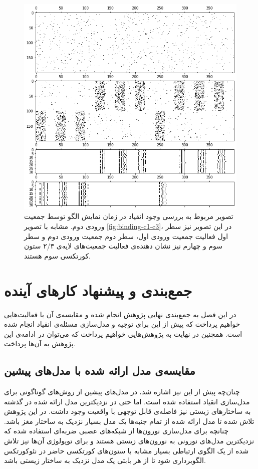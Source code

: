 \documentclass[12pt]{report}
\begin{document}
\begin{figure}[H]
	\centering
	\includegraphics[width=1.0\linewidth]{binding-c2-c3.png}
	\caption[NS]{
		تصویر مربوط به بررسی وجود انقیاد در زمان نمایش الگو توسط جمعیت ورودی دوم. مشابه با تصویر \ref{fig:binding-c1-c3}، در این تصویر نیز سطر اول فعالیت جمعیت ورودی اول، سطر دوم جمعیت ورودی دوم و سطر سوم و چهارم نیز نشان دهنده‌ی فعالیت جمعیت‌های لایه‌ی ۲/۳ ستون کورتکسی سوم هستند.
	}
	\label{fig:binding-c2-c3} 
\end{figure}

	
	
	\chapter{جمع‌بندی و پیشنهاد کار‌های آینده}
	در این فصل به جمع‌بندی نهایی پژوهش انجام شده و مقایسه‌ی آن با فعالیت‌هایی خواهیم پرداخت که پیش از این برای توجیه و مدل‌سازی مسئله‌ی انقیاد انجام شده است. همچنین در نهایت به پژوهش‌هایی خواهیم پرداخت که می‌توان در ادامه‌ی این پژوهش به آن‌ها پرداخت.
	
	\section{مقایسه‌ی مدل ارائه شده با مدل‌های پیشین}
	چنان‌چه پیش از این نیز اشاره شد، در مدل‌های پیشین از روش‌های گوناگونی برای مدل‌سازی انقیاد استفاده شده است. اما حتی در نزدیکترین مدل ارائه شده در گذشته به ساختار‌های زیستی نیز فاصله‌ی قابل توجهی با واقعیت وجود داشت. در این پژوهش تلاش شده تا مدل ارائه شده از تمام جنبه‌ها یک مدل بسیار نزدیک به ساختار مغز باشد. چنانچه برای مدل‌سازی نورون‌ها از شبکه‌های عصبی ضربه‌ای استفاده شده که نزدیکترین مدل‌های نورونی به نورون‌های زیستی هستند و برای توپولوژی آن‌ها نیز تلاش شده از یک الگوی ارتباطی بسیار مشابه با ستون‌های کورتکسی حاضر در نئوکورتکس الگوبرداری شود تا از هر بابتی یک مدل نزدیک به ساختار زیستی باشد.
	
\end{document}

